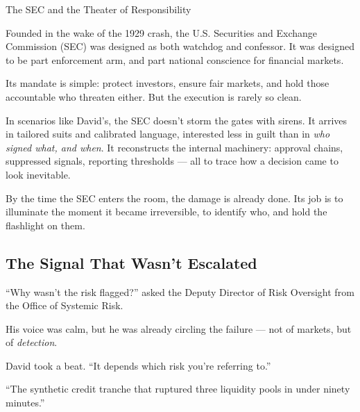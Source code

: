 \begin{HistoricalSidebar}{The SEC and the Theater of Responsibility}

  Founded in the wake of the 1929 crash, the U.S. Securities and Exchange Commission (SEC) was designed as both 
  watchdog and confessor. It was designed to be part enforcement arm, and part national conscience for financial markets.

  \medskip
  
  Its mandate is simple: protect investors, ensure fair markets, and hold those accountable who threaten either. 
  But the execution is rarely so clean.

  \medskip
  
  In scenarios like David’s, the SEC doesn't storm the gates with sirens. It arrives in tailored suits and 
  calibrated language, interested less in guilt than in \textit{who signed what, and when}. It reconstructs the internal 
  machinery: approval chains, suppressed signals, reporting thresholds — all to trace how a decision came to look inevitable.

  \medskip
  
  By the time the SEC enters the room, the damage is already done. Its job is to illuminate the moment it became 
  irreversible, to identify who, and hold the flashlight on them.
  
\end{HistoricalSidebar}

\medskip

\subsection{The Signal That Wasn't Escalated}

``Why wasn’t the risk flagged?'' asked the Deputy Director of Risk Oversight from the Office of Systemic Risk.

His voice was calm, but he was already circling the failure — not of markets, but of \textit{detection}.

David took a beat. ``It depends which risk you’re referring to.''

``The synthetic credit tranche that ruptured three liquidity pools in under ninety minutes.''

\medskip

